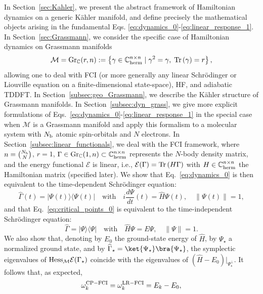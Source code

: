 \documentclass[11pt]{article}
\def\tr{{\rm Tr \,}}
\def\C{{\mathbb C}}
\begin{document}
In Section~\ref{sec:Kahler}, we present the abstract framework of Hamiltonian dynamics on a generic K\"ahler manifold, and define precisely the mathematical objects arising in the fundamental Eqs. \eqref{eq:dynamics_0}-\eqref{eq:linear_response_1}. In Section~\ref{sec:Grassmann}, we consider the specific case of Hamiltonian dynamics on Grassmann manifolds
\begin{equation} \label{eq:Grassmann_1}
\mathcal M= {\rm Gr}_\C(r,n) := \left\{ \gamma \in  \C^{n \times n}_{\rm herm} \; | \; \gamma^2=\gamma, \; \tr(\gamma)=r \right\},
\end{equation}
allowing one to deal with FCI (or more generally any linear Schr\"odinger or Liouville equation on a finite-dimensional state-space), HF, and adiabatic TDDFT. In Section~\ref{subsec:geo_Grassmann}, we describe the K\"ahler structure of Grassmann manifolds. In Section~\ref{subsec:dyn_grass}, we give more explicit formulations of Eqs.~\eqref{eq:dynamics_0}-\eqref{eq:linear_response_1} in the special case when $\mathcal M$ is a Grassmann manifold and apply this formalism to a molecular system with $N_{\rm b}$ atomic spin-orbitals and $N$ electrons. In Section~\ref{subsec:linear_functionals}, we deal with the FCI framework, where $n=\binom{N_{\rm b}}{N}$, $r=1$, $\Gamma\in {\rm Gr}_\C(1,n) \subset \C_{\rm herm}^{n\times n}$ represents the $N$-body density matrix, and the energy functional ${\mathcal E}$ is linear, i.e., ${\mathcal E}(\Gamma)=\tr(H\Gamma)$  with $H\in\C_{\rm herm}^{n\times n}$ the Hamiltonian matrix (specified later). We show that Eq.~\eqref{eq:dynamics_0} is then equivalent to the time-dependent Schr\"odinger equation:
$$
\widehat\Gamma(t) = |\Psi(t)\rangle \langle \Psi(t)| \quad \mbox{with} \quad i \frac{d\Psi}{dt}(t) = \widehat H \Psi(t), \quad \|\Psi(t)\|=1,
$$
and that Eq.~\eqref{eq:critical_points_0} is equivalent to the time-independent Schr\"odinger equation:
$$
 \widehat\Gamma = |\Psi\rangle \langle \Psi| \quad \mbox{with} \quad \widehat H\Psi=E\Psi, \quad  \|\Psi\|=1.
$$
We also show that, denoting by $E_0$ the ground-state energy of $\widehat H$, by $\Psi_\star$ a normalized ground state, and by $\widehat\Gamma_\star=\ket{\Psi_\star}\bra{\Psi_\star}$, the symplectic eigenvalues of ${\rm Hess}_{\mathcal M}\mathcal E(\Gamma_\star)$ coincide with the eigenvalues of 
$
(\widehat H-E_0)|_{\Psi_\star^\perp}.
$
It follows that, as expected,
$$
\omega_k^{\rm CP-FCI} = \omega_k^{\rm LR-FCI}=E_k-E_0,
$$
\end{document}

